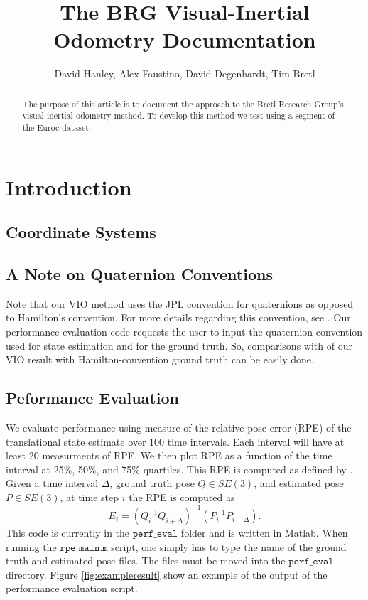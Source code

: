 \documentclass[11pt,a4paper]{article}
\title{The BRG Visual-Inertial Odometry Documentation}
\author{David Hanley, Alex Faustino, David Degenhardt, Tim Bretl}
\begin{document}
\maketitle

\begin{abstract}
 The purpose of this article is to document the approach to the Bretl Research Group's visual-inertial odometry method. To develop this method we test using a segment of the Euroc dataset.
\end{abstract}

\section{Introduction}

\subsection{Coordinate Systems}

\subsection{A Note on Quaternion Conventions}
Note that our VIO method uses the JPL convention for quaternions as opposed to Hamilton's convention. For more details regarding this convention, see \cite{Trawny:2005,Barfoot:2011,Wie:2008}. Our performance evaluation code requests the user to input the quaternion convention used for state estimation and for the ground truth. So, comparisons with of our VIO result with Hamilton-convention ground truth can be easily done. 

\subsection{Peformance Evaluation}
We evaluate performance using measure of the relative pose error (RPE) of the translational state estimate over 100 time intervals. Each interval will have at least 20 measurments of RPE. We then plot RPE as a function of the time interval at 25\%, 50\%, and 75\% quartiles. This RPE is computed as defined by  \cite{Sturm:2012}. Given a time interval $\Delta$, ground truth pose $Q\in SE(3)$, and estimated pose $P\in SE(3)$, at time step $i$ the RPE is computed as
\begin{equation}
	E_i = \left(Q_i^{-1}Q_{i+\Delta}\right)^{-1}\left(P_i^{-1}P_{i+\Delta}\right).
\end{equation}
This code is currently in the $\texttt{perf\_eval}$ folder and is written in Matlab. When running the $\texttt{rpe\_main.m}$ script, one simply has to type the name of the ground truth and estimated pose files. The files must be moved into the $\texttt{perf\_eval}$ directory. Figure \ref{fig:exampleresult} show an example of the output of the performance evaluation script.
\end{document}
